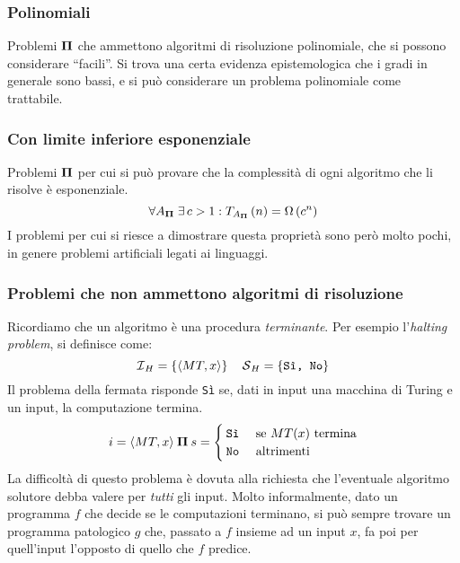\subsubsection{Polinomiali}
Problemi $\bm{\Pi}{}$ che ammettono algoritmi di risoluzione polinomiale, che si possono considerare ``facili''. Si trova una certa evidenza epistemologica che i gradi in generale sono bassi, e si può considerare un problema polinomiale come trattabile.

\subsubsection{Con limite inferiore esponenziale}
Problemi $\bm{\Pi}{}$ per cui si può provare che la complessità di ogni algoritmo che li risolve è esponenziale.
\begin{equation*}
    \forall A_{\bm{\Pi}{}} \; \exists \, c > 1 : T_{A_{\bm{\Pi}{}}} \left( n \right) = \Omega \left( c^{n} \right)
\end{equation*}
I problemi per cui si riesce a dimostrare questa proprietà sono però molto pochi, in genere problemi artificiali legati ai linguaggi.

\subsubsection{Problemi che non ammettono algoritmi di risoluzione}
Ricordiamo che un algoritmo è una procedura \emph{terminante}. Per esempio l'\emph{halting problem}, si definisce come:
\begin{equation*}
    \mathcal{I}{}_{H} = \left\{ \langle MT,x \rangle \right\}
    \quad
    \mathcal{S}{}_{H} = \left\{ \texttt{Sì, No} \right\}
\end{equation*}
Il problema della fermata risponde \texttt{Sì} se, dati in input una macchina di Turing e un input, la computazione termina.
\begin{equation*}
    i = 
    \langle
    MT, x
    \rangle
    \:
    \bm{\Pi}
    \:
    s = 
    \begin{cases}
        \texttt{Sì} & \text{ se $MT(x)$ termina} \\
        \texttt{No} & \text{ altrimenti}
    \end{cases}
\end{equation*}
La difficoltà di questo problema è dovuta alla richiesta che l'eventuale algoritmo solutore debba valere per \emph{tutti} gli input.
Molto informalmente, dato un programma $f$ che decide se le computazioni terminano, si può sempre trovare un programma patologico $g$ che, passato a $f$ insieme ad un input $x$, fa poi per quell'input l'opposto di quello che $f$ predice.

